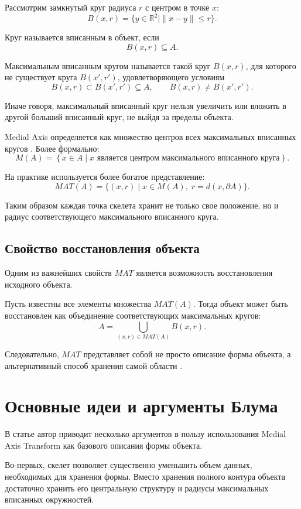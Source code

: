 \documentclass[12pt,a4paper]{article}
\begin{document}
Рассмотрим замкнутый круг радиуса $r$ с центром в точке $x$:
\[
B(x,r)=
\{y\in\mathbb{R}^{2}\mid \|x-y\|\le r\}.
\]

Круг называется вписанным в объект, если
\[
B(x,r)\subseteq A.
\]

Максимальным вписанным кругом называется такой круг $B(x,r)$, для которого не существует круга $B(x',r')$, удовлетворяющего условиям
\[
B(x,r) \subset B(x',r') \subseteq A,
\qquad
B(x,r) \ne B(x',r').
\]

Иначе говоря, максимальный вписанный круг нельзя увеличить или вложить в другой больший вписанный круг, не выйдя за пределы объекта.

Medial Axis определяется как множество центров всех максимальных вписанных кругов \cite{blum1967}. Более формально:
\[
M(A)=
\left\{
x\in A
\mid
x
\text{ является центром максимального вписанного круга}
\right\}.
\]

На практике используется более богатое представление:
\[
MAT(A)=
\{
(x,r)
\mid
x\in M(A),
\; r = d(x,\partial A)
\}.
\]

Таким образом каждая точка скелета хранит не только свое положение, но и радиус соответствующего максимального вписанного круга.

\subsection{Свойство восстановления объекта}

Одним из важнейших свойств $MAT$ является возможность восстановления исходного объекта.

Пусть известны все элементы множества $MAT(A)$. Тогда объект может быть восстановлен как объединение соответствующих максимальных кругов:
\[
A=
\bigcup_{(x,r)\in MAT(A)}
B(x,r).
\]

Следовательно, $MAT$ представляет собой не просто описание формы объекта, а альтернативный способ хранения самой области \cite{blum1967}.

\section{Основные идеи и аргументы Блума}

В статье \cite{blum1967} автор приводит несколько аргументов в пользу использования Medial Axis Transform как базового описания формы объекта.

Во-первых, скелет позволяет существенно уменьшить объем данных, необходимых для хранения формы. Вместо хранения полного контура объекта достаточно хранить его центральную структуру и радиусы максимальных вписанных окружностей.
\end{document}
